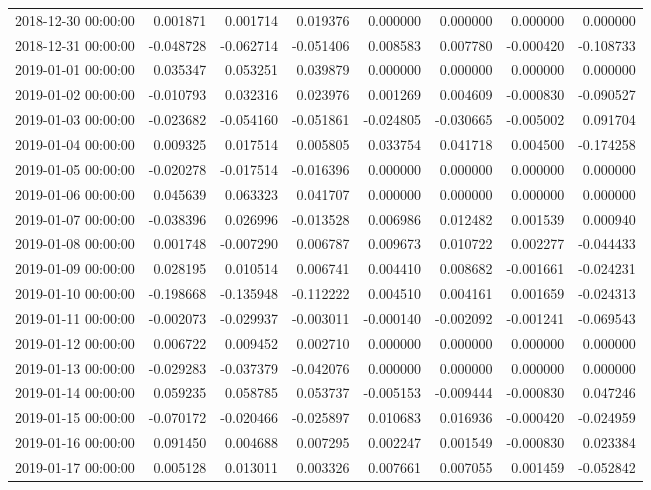 \begin{tabular}{lrrrrrrr}
2018-12-30 00:00:00 & 0.001871 & 0.001714 & 0.019376 & 0.000000 & 0.000000 & 0.000000 & 0.000000 \\
2018-12-31 00:00:00 & -0.048728 & -0.062714 & -0.051406 & 0.008583 & 0.007780 & -0.000420 & -0.108733 \\
2019-01-01 00:00:00 & 0.035347 & 0.053251 & 0.039879 & 0.000000 & 0.000000 & 0.000000 & 0.000000 \\
2019-01-02 00:00:00 & -0.010793 & 0.032316 & 0.023976 & 0.001269 & 0.004609 & -0.000830 & -0.090527 \\
2019-01-03 00:00:00 & -0.023682 & -0.054160 & -0.051861 & -0.024805 & -0.030665 & -0.005002 & 0.091704 \\
2019-01-04 00:00:00 & 0.009325 & 0.017514 & 0.005805 & 0.033754 & 0.041718 & 0.004500 & -0.174258 \\
2019-01-05 00:00:00 & -0.020278 & -0.017514 & -0.016396 & 0.000000 & 0.000000 & 0.000000 & 0.000000 \\
2019-01-06 00:00:00 & 0.045639 & 0.063323 & 0.041707 & 0.000000 & 0.000000 & 0.000000 & 0.000000 \\
2019-01-07 00:00:00 & -0.038396 & 0.026996 & -0.013528 & 0.006986 & 0.012482 & 0.001539 & 0.000940 \\
2019-01-08 00:00:00 & 0.001748 & -0.007290 & 0.006787 & 0.009673 & 0.010722 & 0.002277 & -0.044433 \\
2019-01-09 00:00:00 & 0.028195 & 0.010514 & 0.006741 & 0.004410 & 0.008682 & -0.001661 & -0.024231 \\
2019-01-10 00:00:00 & -0.198668 & -0.135948 & -0.112222 & 0.004510 & 0.004161 & 0.001659 & -0.024313 \\
2019-01-11 00:00:00 & -0.002073 & -0.029937 & -0.003011 & -0.000140 & -0.002092 & -0.001241 & -0.069543 \\
2019-01-12 00:00:00 & 0.006722 & 0.009452 & 0.002710 & 0.000000 & 0.000000 & 0.000000 & 0.000000 \\
2019-01-13 00:00:00 & -0.029283 & -0.037379 & -0.042076 & 0.000000 & 0.000000 & 0.000000 & 0.000000 \\
2019-01-14 00:00:00 & 0.059235 & 0.058785 & 0.053737 & -0.005153 & -0.009444 & -0.000830 & 0.047246 \\
2019-01-15 00:00:00 & -0.070172 & -0.020466 & -0.025897 & 0.010683 & 0.016936 & -0.000420 & -0.024959 \\
2019-01-16 00:00:00 & 0.091450 & 0.004688 & 0.007295 & 0.002247 & 0.001549 & -0.000830 & 0.023384 \\
2019-01-17 00:00:00 & 0.005128 & 0.013011 & 0.003326 & 0.007661 & 0.007055 & 0.001459 & -0.052842 \\

\end{tabular}
